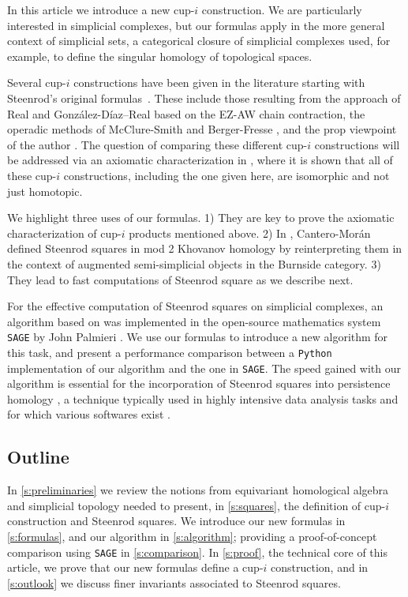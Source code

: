 In this article we introduce a new cup-$i$ construction. 
We are particularly interested in simplicial complexes, but our formulas apply in the more general context of simplicial sets, a categorical closure of simplicial complexes used, for example, to define the singular homology of topological spaces.

Several cup-$i$ constructions have been given in the literature starting with Steenrod's original formulas~\cite{steenrod1947products}.
These include those resulting from the approach of Real \cite{real1996computability} and Gonz\'alez-D\'iaz--Real \cite{gonzalez-diaz1999steenrod, gonzalez2003computation, gonzalez-diaz2005cocyclic} based on the EZ-AW chain contraction, the operadic methods of McClure-Smith \cite{mcclure2003multivariable} and Berger-Fresse \cite{berger2004combinatorial}, and the prop viewpoint of the author \cite{medina2020prop1, medina2018prop2}.
The question of comparing these different cup-$i$ constructions will be addressed via an axiomatic characterization in \cite{medina2018axiomatic}, where it is shown that all of these cup-$i$ constructions, including the one given here, are isomorphic and not just homotopic.

We highlight three uses of our formulas.
1) They are key to prove the axiomatic characterization of cup-$i$ products mentioned above.
2) In \cite{cantero2020khovanov}, Cantero-Mor\'an defined Steenrod squares in mod 2 Khovanov homology \cite{khovanov2000categorification} by reinterpreting them in the context of augmented semi-simplicial objects in the Burnside category.
3) They lead to fast computations of Steenrod square as we describe next.

For the effective computation of Steenrod squares on simplicial complexes, an algorithm based on \cite{gonzalez-diaz1999steenrod} was implemented in the open-source mathematics system \verb|SAGE| by John Palmieri \cite{sagemath}.
We use our formulas to introduce a new algorithm for this task, and present a performance comparison between a \verb|Python| implementation of our algorithm and the one in \verb|SAGE|.
The speed gained with our algorithm is essential for the incorporation of Steenrod squares into persistence homology \cite{medina2018persistence}, a technique typically used in highly intensive data analysis tasks \cite{carlsson2008images, carlsson2013viral, lee2018nanoporous} and for which various softwares exist \cite{bauer2019ripser, gudhi, medina2021giotto}.

\subsection*{Outline}

In \cref{s:preliminaries} we review the notions from equivariant homological algebra and simplicial topology needed to present, in \cref{s:squares}, the definition of cup-$i$ construction and Steenrod squares.
We introduce our new formulas in \cref{s:formulas}, and our algorithm in \cref{s:algorithm}; providing a proof-of-concept comparison using \verb|SAGE| in \cref{s:comparison}.
In \cref{s:proof}, the technical core of this article, we prove that our new formulas define a cup-$i$ construction, and in \cref{s:outlook} we discuss finer invariants associated to Steenrod squares.